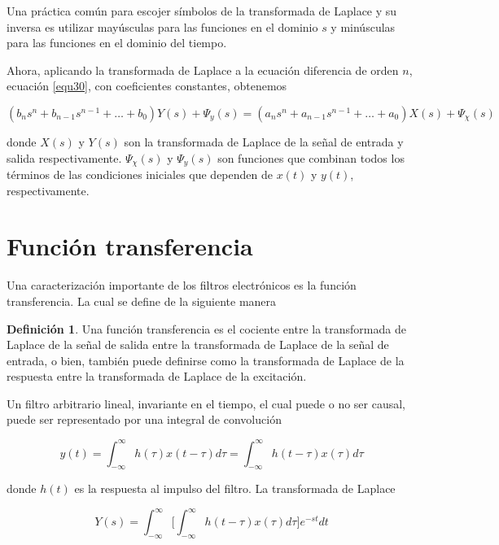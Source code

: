 \documentclass[12pt]{book}
\theoremstyle{definition}
\newtheorem{dfn}{Definición}[section]
\theoremstyle{remark}
\theoremstyle{plain}
\begin{document}
Una práctica común para escojer símbolos de la transformada de Laplace y su inversa es utilizar mayúsculas para las funciones en el dominio $s$ y minúsculas para las funciones en el dominio del tiempo.

Ahora, aplicando la transformada de Laplace a la ecuación diferencia de orden $n$, ecuación \ref{equ30}, con coeficientes constantes, obtenemos

\begin{equation}
\label{equ32}
 (b_n s^n+b_{n-1} s^{n-1}+ \dotsc  + b_0) Y(s)+ \Psi _{y} (s)=(a_n s^n +a_{n-1} s^{n-1} + \dotsc + a_0)X(s)+ \Psi _{\chi} (s)
\end{equation}

donde
$X(s)$ y $Y(s)$ son la transformada de Laplace de la señal de entrada y salida respectivamente.
$ \Psi _{\chi} (s)$ y $\Psi _{y} (s)$ son funciones que combinan todos los términos de las  condiciones iniciales que dependen de $x(t)$ y $y(t)$, respectivamente.

\section{Función transferencia}
Una caracterización importante de los filtros electrónicos es la función transferencia. La cual se define de la siguiente manera

\begin{dfn}
\label{def5}
Una función transferencia es el cociente entre la transformada de Laplace de la señal de salida entre la transformada de Laplace de la señal de entrada, o bien, también puede definirse como la transformada de Laplace de la respuesta entre la transformada de Laplace de la excitación.
\end{dfn}

Un filtro arbitrario lineal, invariante en el tiempo, el cual puede o no ser causal, puede ser representado por una integral de convolución

\begin{equation}
\label{equ33}
 y(t)= \int_{- \infty}^{\infty} h(\tau) x(t- \tau)d \tau= \int_{- \infty}^{\infty} h(t - \tau) x( 
\tau) d \tau
\end{equation}

donde $h(t)$ es la respuesta al impulso del filtro. La transformada de Laplace 

\begin{equation*}
 Y(s)=  \int_{- \infty}^{\infty} \bigg [ \int_{- \infty}^{\infty} h(t - \tau) x(\tau)d \tau \bigg ]e^{-s t} d t
\end{equation*}
\end{document}
